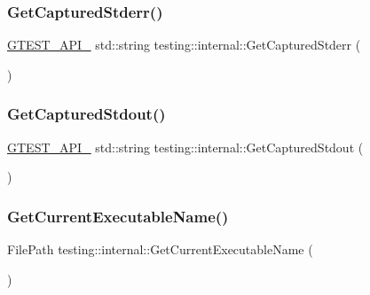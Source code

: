 \mbox{\label{namespacetesting_1_1internal_a374156401da17704099d0c33fa53adfb}} 
\subsubsection{\texorpdfstring{GetCapturedStderr()}{GetCapturedStderr()}}
{\footnotesize\ttfamily \mbox{\hyperlink{gtest-port_8h_aa73be6f0ba4a7456180a94904ce17790}{G\+T\+E\+S\+T\+\_\+\+A\+P\+I\+\_\+}} std\+::string testing\+::internal\+::\+Get\+Captured\+Stderr (\begin{DoxyParamCaption}{ }\end{DoxyParamCaption})}

\mbox{\label{namespacetesting_1_1internal_aed657219a9856a8d249a3230de0c54ce}} 
\subsubsection{\texorpdfstring{GetCapturedStdout()}{GetCapturedStdout()}}
{\footnotesize\ttfamily \mbox{\hyperlink{gtest-port_8h_aa73be6f0ba4a7456180a94904ce17790}{G\+T\+E\+S\+T\+\_\+\+A\+P\+I\+\_\+}} std\+::string testing\+::internal\+::\+Get\+Captured\+Stdout (\begin{DoxyParamCaption}{ }\end{DoxyParamCaption})}

\mbox{\label{namespacetesting_1_1internal_a7a2bbf069f75bc99873976ad6fc356ad}} 
\subsubsection{\texorpdfstring{GetCurrentExecutableName()}{GetCurrentExecutableName()}}
{\footnotesize\ttfamily File\+Path testing\+::internal\+::\+Get\+Current\+Executable\+Name (\begin{DoxyParamCaption}{ }\end{DoxyParamCaption})}

